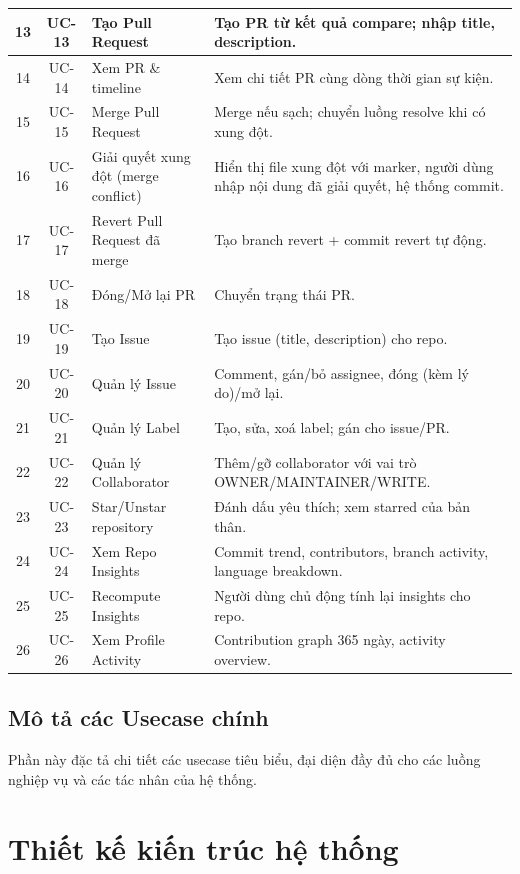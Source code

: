 \begin{longtable}{|c|c|p{5.2cm}|p{6.0cm}|}
13 & UC-13 & Tạo Pull Request & Tạo PR từ kết quả compare; nhập title, description.\\\hline
14 & UC-14 & Xem PR \& timeline & Xem chi tiết PR cùng dòng thời gian sự kiện.\\\hline
15 & UC-15 & Merge Pull Request & Merge nếu sạch; chuyển luồng resolve khi có xung đột.\\\hline
16 & UC-16 & Giải quyết xung đột (merge conflict) & Hiển thị file xung đột với marker, người dùng nhập nội dung đã giải quyết, hệ thống commit.\\\hline
17 & UC-17 & Revert Pull Request đã merge & Tạo branch revert + commit revert tự động.\\\hline
18 & UC-18 & Đóng/Mở lại PR & Chuyển trạng thái PR.\\\hline
19 & UC-19 & Tạo Issue & Tạo issue (title, description) cho repo.\\\hline
20 & UC-20 & Quản lý Issue & Comment, gán/bỏ assignee, đóng (kèm lý do)/mở lại.\\\hline
21 & UC-21 & Quản lý Label & Tạo, sửa, xoá label; gán cho issue/PR.\\\hline
22 & UC-22 & Quản lý Collaborator & Thêm/gỡ collaborator với vai trò OWNER/MAINTAINER/WRITE.\\\hline
23 & UC-23 & Star/Unstar repository & Đánh dấu yêu thích; xem starred của bản thân.\\\hline
24 & UC-24 & Xem Repo Insights & Commit trend, contributors, branch activity, language breakdown.\\\hline
25 & UC-25 & Recompute Insights & Người dùng chủ động tính lại insights cho repo.\\\hline
26 & UC-26 & Xem Profile Activity & Contribution graph 365 ngày, activity overview.\\\hline
\end{longtable}

\subsection{Mô tả các Usecase chính}
Phần này đặc tả chi tiết các usecase tiêu biểu, đại diện đầy đủ cho các luồng nghiệp vụ và các tác nhân của hệ thống.



\section{Thiết kế kiến trúc hệ thống}

